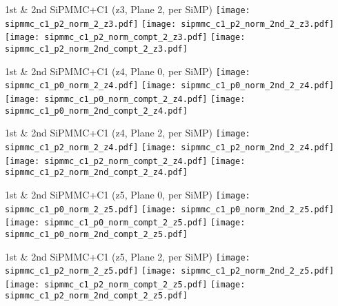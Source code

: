 \documentclass{beamer}
\begin{document}
\begin{frame}{1st \& 2nd SiPMMC+C1 (z3, Plane 2, per SiMP)}
	\texttt{[image: sipmmc\_c1\_p2\_norm\_2\_z3.pdf]}
	\texttt{[image: sipmmc\_c1\_p2\_norm\_2nd\_2\_z3.pdf]} \\
	
		\texttt{[image: sipmmc\_c1\_p2\_norm\_compt\_2\_z3.pdf]}
		\texttt{[image: sipmmc\_c1\_p2\_norm\_2nd\_compt\_2\_z3.pdf]}
\end{frame}

\begin{frame}{1st \& 2nd SiPMMC+C1 (z4, Plane 0, per SiMP)}
	\texttt{[image: sipmmc\_c1\_p0\_norm\_2\_z4.pdf]}
	\texttt{[image: sipmmc\_c1\_p0\_norm\_2nd\_2\_z4.pdf]} \\
	
		\texttt{[image: sipmmc\_c1\_p0\_norm\_compt\_2\_z4.pdf]}
		\texttt{[image: sipmmc\_c1\_p0\_norm\_2nd\_compt\_2\_z4.pdf]}
\end{frame}

\begin{frame}{1st \& 2nd SiPMMC+C1 (z4, Plane 2, per SiMP)}
	\texttt{[image: sipmmc\_c1\_p2\_norm\_2\_z4.pdf]}
	\texttt{[image: sipmmc\_c1\_p2\_norm\_2nd\_2\_z4.pdf]} \\
	
		\texttt{[image: sipmmc\_c1\_p2\_norm\_compt\_2\_z4.pdf]}
		\texttt{[image: sipmmc\_c1\_p2\_norm\_2nd\_compt\_2\_z4.pdf]}
\end{frame}

\begin{frame}{1st \& 2nd SiPMMC+C1 (z5, Plane 0, per SiMP)}
	\texttt{[image: sipmmc\_c1\_p0\_norm\_2\_z5.pdf]}
	\texttt{[image: sipmmc\_c1\_p0\_norm\_2nd\_2\_z5.pdf]} \\
	
		\texttt{[image: sipmmc\_c1\_p0\_norm\_compt\_2\_z5.pdf]}
		\texttt{[image: sipmmc\_c1\_p0\_norm\_2nd\_compt\_2\_z5.pdf]}
\end{frame}

\begin{frame}{1st \& 2nd SiPMMC+C1 (z5, Plane 2, per SiMP)}
	\texttt{[image: sipmmc\_c1\_p2\_norm\_2\_z5.pdf]}
	\texttt{[image: sipmmc\_c1\_p2\_norm\_2nd\_2\_z5.pdf]} \\
	
		\texttt{[image: sipmmc\_c1\_p2\_norm\_compt\_2\_z5.pdf]}
		\texttt{[image: sipmmc\_c1\_p2\_norm\_2nd\_compt\_2\_z5.pdf]}
\end{frame}
\end{document}
